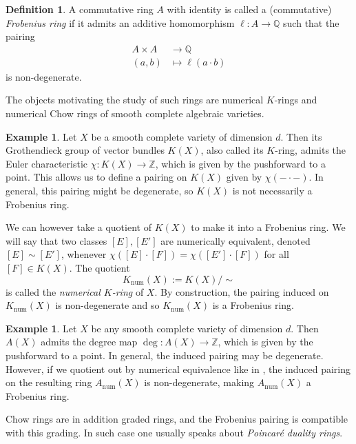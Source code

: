 \documentclass[oneside]{amsart}
\theoremstyle{plain}
\theoremstyle{definition}
\newtheorem{definition}[theorem]{Definition}
\newtheorem{example}[theorem]{Example}
\newcommand{\Z}{{\mathbb{Z}}}
\newcommand{\Q}{{\mathbb{Q}}}
\begin{document}
\begin{definition}
    A commutative ring $A$ with identity is called a (commutative) \emph{Frobenius ring}
    if it admits an additive homomorphism $\ell: A \to \Q$ such that the pairing
    \begin{align*}
    A \times A &\to \Q\\
       (a, b) &\mapsto \ell(a\cdot b) 
    \end{align*}
    is non-degenerate.
\end{definition}

The objects motivating the study of such rings are numerical $K$-rings and numerical Chow rings of smooth complete algebraic varieties.

\begin{example}
\label{ex:numerical-K}
    Let $X$ be a smooth complete variety of dimension $d$. Then its Grothendieck group of vector bundles $K(X)$, also called its $K$-ring, admits the Euler characteristic $\chi: K(X) \to \Z$, which is given by the pushforward to a point.
    This allows us to define a pairing on $K(X)$ given by $\chi(-\cdot -)$. In general, this pairing might be degenerate, so $K(X)$ is not necessarily a Frobenius ring.

    We can however take a quotient of $K(X)$ to make it into a Frobenius ring.
    We will say that two classes $[E], [E']$ are numerically equivalent, denoted $[E] \sim [E']$,
    whenever $\chi([E] \cdot [F]) = \chi([E'] \cdot [F])$ for all $[F] \in K(X)$. The quotient
    \[K_\mathrm{num}(X) := K(X)/\sim\]
    is called the \emph{numerical $K$-ring} of $X$.
    By construction, the pairing induced on $K_\mathrm{num}(X)$ is non-degenerate and so $K_\mathrm{num}(X)$ is a Frobenius ring.
\end{example}

\begin{example}
\label{ex:numerical-chow}
    Let $X$ be any smooth complete variety of dimension $d$. Then $A(X)$ admits the degree map $\deg: A(X) \to \Z$, which is given by the pushforward to a point. In general, the induced pairing may be degenerate. However, if we quotient out by numerical equivalence like in , the induced pairing on the resulting ring $A_\mathrm{num}(X)$ is non-degenerate, making $A_\mathrm{num}(X)$ a Frobenius ring.
\end{example}

Chow rings are in addition graded rings, and the Frobenius pairing is compatible with this grading. In such case one usually speaks about \emph{Poincar\'e duality rings}.
\end{document}
